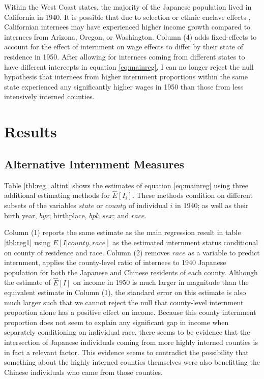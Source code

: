 \documentclass[12pt]{article}
\begin{document}
Within the West Coast states,
the majority of the Japanese population lived in California in 1940.
It is possible that due to selection or ethnic enclave effects
\citep{edinEthnicEnclavesEconomic2003},
Californian internees may have experienced higher income growth
compared to internees from Arizona, Oregon, or Washington.
Column (4) adds fixed-effects to account for the effect of internment on wage effects to
differ by their state of residence in 1950.
After allowing for internees coming from different states
to have different intercepts in equation \ref{eq:mainreg},
I can no longer reject the null hypothesis that
internees from higher internment proportions within the same state
experienced any significantly higher wages in 1950
than those from less intensively interned counties.
\section{Results}
\label{sec:org33d384e}


\subsection{Alternative Internment Measures}
\label{sec:orgb6c0417}

Table \ref{tbl:reg_altint} shows the estimates of equation \ref{eq:mainreg}
using three additional estimating methods for \(\hat{E}[I_i]\).
These methods condition on different subsets of the variables
\(state\) or \(county\) of individual \(i\) in 1940;
as well as their birth year, \(byr\); birthplace, \(bpl\); \(sex\); and \(race\).



Column (1) reports the same estimate as the main regression result
in table \ref{tbl:reg1} using \(\hat{E}[I|county, race]\)
as the estimated internment status conditional on county of residence and race.
Column (2) removes \(race\) as a variable to predict internment,
applies the county-level ratio of internees to 1940 Japanese population
for both the Japanese and Chinese residents of each county.
Although the estimate of \(\hat{E}[I]\) on income in 1950
is much larger in magnitude than the equivalent estimate in Column (1),
the standard error on this estimate is also much larger
such that we cannot reject the null that county-level internment proportion alone
has a positive effect on income.
Because this county internment proportion
does not seem to explain any significant gap in income
when separately conditioning on individual race,
there seems to be evidence that the intersection of Japanese individuals
coming from more highly interned counties is in fact a relevant factor.
This evidence seems to contradict the possibility that something about the
highly interned counties themselves were also benefitting the Chinese individuals
who came from those counties.
\end{document}
